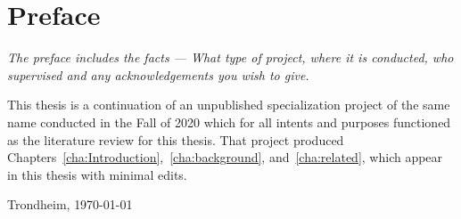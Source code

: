 \chapter*{Preface}
\vspace{1cm}
{\it\color{red}
The preface includes the facts --- What type of project, where it is conducted, who supervised and any acknowledgements you wish to give.}

This thesis is a continuation of an unpublished specialization project of the same name conducted in the Fall of 2020 which for all intents and purposes functioned as the literature review for this thesis. That project produced Chapters~\ref{cha:Introduction},~\ref{cha:background}, and~\ref{cha:related}, which appear in this thesis with minimal edits.
\vfill
\begin{flushright}
    \thesisAuthor\par
    Trondheim, {\usdate\today}
\end{flushright}
